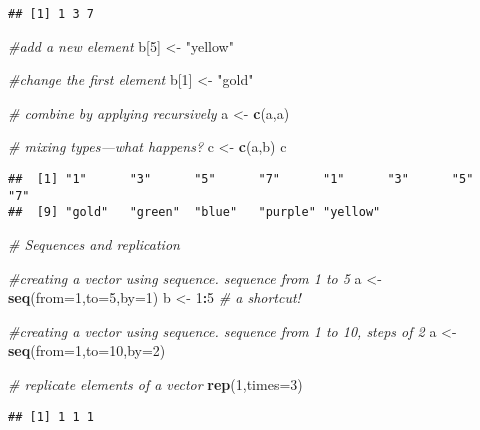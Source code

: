 \documentclass[
]{article}
\newenvironment{Shaded}{\begin{snugshade}}{\end{snugshade}}
\newcommand{\CommentTok}[1]{\textcolor[rgb]{0.56,0.35,0.01}{\textit{#1}}}
\newcommand{\DataTypeTok}[1]{\textcolor[rgb]{0.13,0.29,0.53}{#1}}
\newcommand{\DecValTok}[1]{\textcolor[rgb]{0.00,0.00,0.81}{#1}}
\newcommand{\KeywordTok}[1]{\textcolor[rgb]{0.13,0.29,0.53}{\textbf{#1}}}
\newcommand{\NormalTok}[1]{#1}
\newcommand{\OperatorTok}[1]{\textcolor[rgb]{0.81,0.36,0.00}{\textbf{#1}}}
\newcommand{\StringTok}[1]{\textcolor[rgb]{0.31,0.60,0.02}{#1}}
\begin{document}
\begin{verbatim}
## [1] 1 3 7
\end{verbatim}

\begin{Shaded}
\begin{Highlighting}[]
\CommentTok{#add a new element}
\NormalTok{b[}\DecValTok{5}\NormalTok{] <-}\StringTok{ "yellow"}


\CommentTok{#change the first element}
\NormalTok{b[}\DecValTok{1}\NormalTok{] <-}\StringTok{ "gold"}


\CommentTok{# combine by applying recursively}
\NormalTok{a <-}\StringTok{ }\KeywordTok{c}\NormalTok{(a,a)}


\CommentTok{# mixing types---what happens?}
\NormalTok{c <-}\StringTok{ }\KeywordTok{c}\NormalTok{(a,b)}
\NormalTok{c}
\end{Highlighting}
\end{Shaded}

\begin{verbatim}
##  [1] "1"      "3"      "5"      "7"      "1"      "3"      "5"      "7"     
##  [9] "gold"   "green"  "blue"   "purple" "yellow"
\end{verbatim}

\begin{Shaded}
\begin{Highlighting}[]
\CommentTok{# Sequences and replication}

\CommentTok{#creating a vector using sequence. sequence from 1 to 5}
\NormalTok{a <-}\StringTok{ }\KeywordTok{seq}\NormalTok{(}\DataTypeTok{from=}\DecValTok{1}\NormalTok{,}\DataTypeTok{to=}\DecValTok{5}\NormalTok{,}\DataTypeTok{by=}\DecValTok{1}\NormalTok{)}
\NormalTok{b <-}\StringTok{ }\DecValTok{1}\OperatorTok{:}\DecValTok{5}                    \CommentTok{# a shortcut!}

\CommentTok{#creating a vector using sequence. sequence from 1 to 10, steps of 2}
\NormalTok{a <-}\StringTok{ }\KeywordTok{seq}\NormalTok{(}\DataTypeTok{from=}\DecValTok{1}\NormalTok{,}\DataTypeTok{to=}\DecValTok{10}\NormalTok{,}\DataTypeTok{by=}\DecValTok{2}\NormalTok{)}

\CommentTok{# replicate elements of a vector}
\KeywordTok{rep}\NormalTok{(}\DecValTok{1}\NormalTok{,}\DataTypeTok{times=}\DecValTok{3}\NormalTok{)}
\end{Highlighting}
\end{Shaded}

\begin{verbatim}
## [1] 1 1 1
\end{verbatim}
\end{document}
